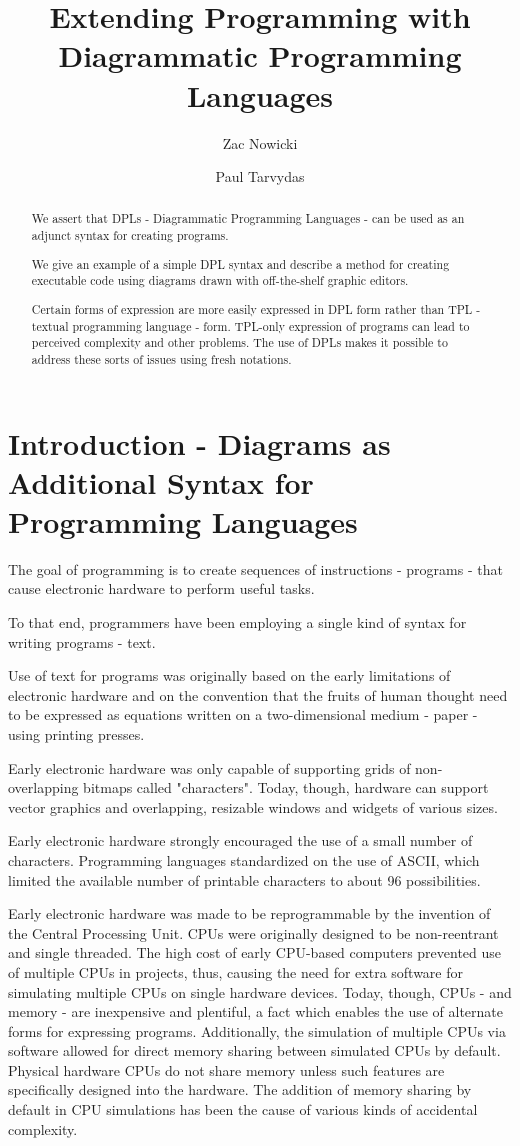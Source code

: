 \documentclass[10pt,anonymous,review]{acmart}
\title{Extending Programming with Diagrammatic Programming Languages}
\author{Zac Nowicki}
\affiliation{
  \institution{Kagi Inc.}
  \city{Palo Alto}
  \state{CA}
  \country{USA}
}
\author{Paul Tarvydas}
\affiliation{
  \institution{Retired}
  \city{Toronto}
  \state{Ontario}
  \country{Canada}
}
\begin{document}
\begin{abstract}

We assert that DPLs - Diagrammatic Programming Languages - can be used as an adjunct syntax for creating programs.

We give an example of a simple DPL syntax and describe a method for creating executable code using diagrams drawn with off-the-shelf graphic editors.
  
Certain forms of expression are more easily expressed in DPL form rather than TPL - textual programming language - form. TPL-only expression of programs can lead to perceived complexity and other problems. The use of DPLs makes it possible to address these sorts of issues using fresh notations.
\end{abstract}

\maketitle

\section{Introduction - Diagrams as Additional Syntax for Programming Languages}
The goal of programming is to create sequences of instructions -
programs - that cause electronic hardware to perform useful tasks.

To that end, programmers have been employing a single kind of syntax for writing programs -
text.

Use of text for programs was originally based on the early limitations of
electronic hardware and on the convention that the fruits of human thought need to be
expressed as equations written on a two-dimensional medium - paper -
using printing presses.

Early electronic hardware was only capable of supporting grids of
non-overlapping bitmaps called "characters". Today, though, hardware can
support vector graphics and overlapping, resizable windows and widgets of various sizes.

Early electronic hardware strongly encouraged the use of a small number of characters. Programming languages standardized on the use of ASCII, which limited the available number of printable characters to about 96 possibilities.

Early electronic hardware was made to be reprogrammable by the invention of
the Central Processing Unit. CPUs were originally designed to be
non-reentrant and single threaded. The high cost of early CPU-based
computers prevented use of multiple CPUs in projects, thus, causing the
need for extra software for simulating multiple CPUs on single
hardware devices. Today, though, CPUs - and memory - are inexpensive and
plentiful, a fact which enables the use of alternate forms for
expressing programs. Additionally, the simulation of multiple CPUs via software 
allowed for direct memory sharing between simulated CPUs by default. Physical 
hardware CPUs do not share memory unless such features are specifically 
designed into the hardware. The addition of memory sharing by default in CPU simulations
has been the cause of various kinds of accidental complexity.
\end{document}
